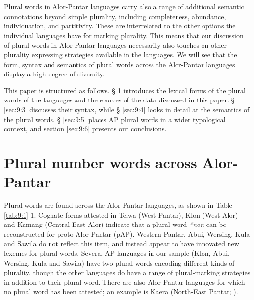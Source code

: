  Plural words in Alor-Pantar languages carry also a range of additional semantic connotations beyond simple plurality, including completeness, abundance, individuation, and partitivity. These are interrelated to the other options the individual languages have for marking plurality. This means that our discussion of plural words in Alor-Pantar languages necessarily also touches on other plurality expressing strategies available in the languages. We will see that the form, syntax and semantics of plural words across the Alor-Pantar languages display a high degree of diversity.

This paper is structured as follows. {\S} \ref{sec:9:2} introduces the lexical forms of the plural words of the languages and the sources of the data discussed in this paper. {\S} \ref{sec:9:3} discusses their syntax, while {\S} \ref{sec:9:4} looks in detail at the semantics of the plural words. {\S} \ref{sec:9:5} places AP plural words in a wider typological context, and section \ref{sec:9:6} presents our conclusions.

\section{Plural number words across Alor-Pantar}  %
\label{sec:9:2}
Plural words are found across the Alor-Pantar languages, as shown in Table \ref{tab:9:1} 1. Cognate forms attested in Teiwa (West Pantar), Klon (West Alor) and Kamang (Central-East Alor) indicate that a plural word \textit{*non} can be reconstructed for proto-Alor-Pantar (pAP). Western Pantar, Abui, Wersing, Kula and Sawila do not reflect this item, and instead appear to have innovated new lexemes for plural words. Several AP languages in our sample (Klon, Abui, Wersing, Kula and Sawila) have two plural words encoding different kinds of plurality, though the other languages do have a range of plural-marking strategies in addition to their plural word. There are also Alor-Pantar languages for which no plural word has been attested; an example is Kaera (North-East Pantar; \citealt{Klamertakaera}).



